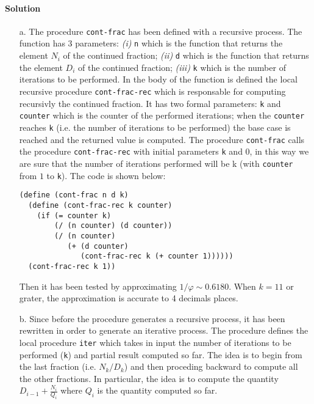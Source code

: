 \paragraph{Solution}
\begin{itemize}
    \item[a.] The procedure \texttt{cont-frac} has been defined with a recursive process. The function has 3 parameters: \textit{(i)}
        \texttt{n} which is the function that returns the element $ N_{i} $ of the continued fraction; \textit{(ii)} \texttt{d}
        which is the function that returns the element $ D_{i} $ of the continued fraction; \textit{(iii)} \texttt{k} which is the
        number of iterations to be performed.
        In the body of the function is defined the local recursive procedure \texttt{cont-frac-rec} which is responsable for
        computing recursivly the continued fraction. It has two formal parameters: \texttt{k} and \texttt{counter} which is the 
        counter of the performed iterations; when the \texttt{counter} reaches \texttt{k} (i.e. the number of iterations to be
        performed) the base case is reached and the returned value is computed.
        The procedure \texttt{cont-frac} calls the procedure \texttt{cont-frac-rec} with initial parameters \texttt{k} and $ 0 $,
        in this way we are sure that the number of iterations performed will be k (with \texttt{counter} from $1$ to \texttt{k}).
        The code is shown below:
\begin{lstlisting}[caption={Recursive procedure \texttt{cont-frac}},captionpos=b]
(define (cont-frac n d k)
  (define (cont-frac-rec k counter) 
    (if (= counter k)
        (/ (n counter) (d counter))
        (/ (n counter)
           (+ (d counter) 
              (cont-frac-rec k (+ counter 1))))))
  (cont-frac-rec k 1))
\end{lstlisting}
        Then it has been tested by approximating $ 1 / \varphi \sim 0.6180 $. When $ k = 11 $ or grater, the approximation is
        accurate to 4 decimals places.
    \item[b.] Since before the procedure generates a recursive process, it has been rewritten in order to generate an iterative
        process. The procedure defines the local procedure \texttt{iter} which takes in input the number of iterations to 
        be performed (\texttt{k}) and partial result computed so far. The idea is to begin from the last fraction (i.e. 
        $ N_{k} / D_{k} $) and then proceding backward to compute all the other fractions. In particular, the idea is to compute
        the quantity $ D_{i - 1} + \frac{N_{i}}{Q_{i}} $ where $ Q_{i} $ is the quantity computed so far.

\end{itemize}
